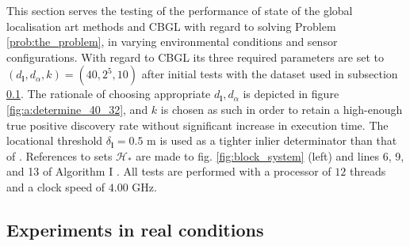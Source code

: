 This section serves the testing of the performance of state of the global
localisation art methods and CBGL with regard to solving Problem
\ref{prob:the_problem}, in varying environmental conditions and sensor
configurations. With regard to CBGL its three required parameters are set to
$(d_{\bm{l}},d_{\alpha},k) = (40, 2^5, 10)$ after initial tests with the
dataset used in subsection \ref{subsec:exp_a}.  The rationale of choosing
appropriate $d_{\bm{l}},d_{\alpha}$ is depicted in figure
\ref{fig:a:determine_40_32}, and $k$ is chosen as such in order to retain a
high-enough true positive discovery rate without significant increase in
execution time. The locational threshold $\delta_{\bm{l}} = 0.5$ m is used as
a tighter inlier determinator than that of \cite{Filotheou2022g}.
References to sets $\mathcal{H}_{\ast}$ are made to fig. \ref{fig:block_system}
(left) and lines
6, 9, and 13 of Algorithm
I \cite{Filotheou2023c}. All tests are performed with a processor of $12$
threads and a clock speed of $4.00$ GHz.


\subsection{Experiments in real conditions}
\label{subsec:exp_a}

